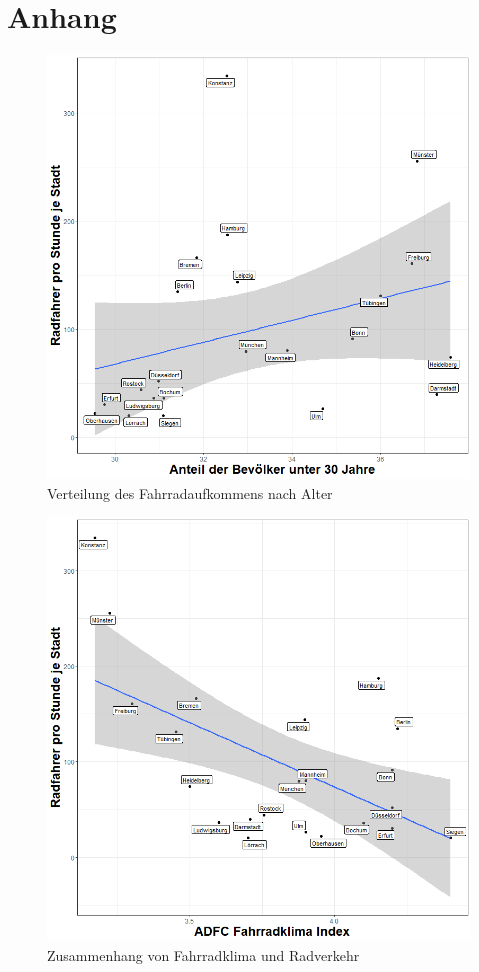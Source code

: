 \documentclass[a4paper,12pt]{thesis}
\begin{document}
\chapter{Anhang}

\begin{figure}[!ht]
	\centering
	\includegraphics[width=\textwidth]{Plots/plot03.png}
	\caption{Verteilung des Fahrradaufkommens nach Alter}
	\label{Alter}
\end{figure}

\begin{figure}[!ht]
	\centering
	\includegraphics[width=\textwidth]{Plots/plot05.png}
	\caption{Zusammenhang von Fahrradklima und Radverkehr}
	\label{Fahrradklima}
\end{figure}
\end{document}
